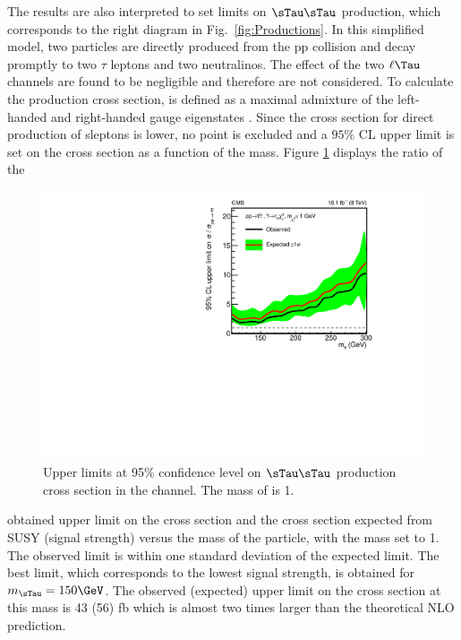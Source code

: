 The results are also interpreted to set limits on $\sTau\sTau$ production, 
which corresponds to the right diagram in Fig.~\ref{fig:Productions}. 
In this simplified model, two \sTau particles are directly produced from the pp  collision and decay promptly to two $\tau$ leptons and two neutralinos. 
The effect of the two $\ell\Tau$ channels are found to be negligible and therefore are not considered.
To calculate the production cross section, \sTau is 
defined as a maximal admixture of the left-handed and right-handed \sTau gauge eigenstates \cite{Fuks:2013lya}. 
Since the cross section for direct production of sleptons is lower, no point is excluded and a $95\%$ CL upper limit is set on 
the cross section  as a function of the \sTau mass. 
Figure \ref{fig:limit_stau_stau} displays the ratio of the 
\begin{linenomath}
\begin{figure}[!htb]
\centering
\includegraphics[width=1.0\textwidth,keepaspectratio=true]{StatisticsFig/ExclusionSTauSTauLsp1.pdf}
\caption{Upper limits at 95\% confidence level on $\sTau\sTau$ production cross section in the \tauTau channel. The mass of \PSGczDo is 1\GeV.}
\label{fig:limit_stau_stau}
\end{figure}
\end{linenomath}
obtained upper limit on the cross section and the cross section expected from SUSY (signal strength) versus the mass of the \sTau particle, with the \PSGczDo mass set to 1\GeV.
The observed limit is within one standard deviation of  the expected limit.
The best limit, which corresponds to the lowest signal strength, is obtained for $m_{\sTau}=150\GeV$. The observed (expected) upper limit on the cross section at this mass is 43 (56) fb which is almost two  times larger than the theoretical NLO prediction.



